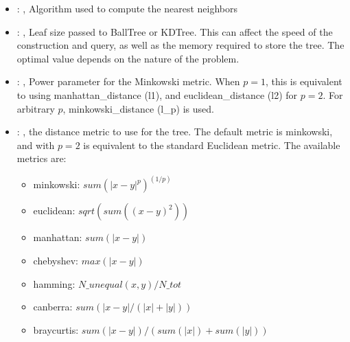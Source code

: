 \begin{itemize}
    \item {}: ,
      Algorithm used to compute the nearest neighbors

    \item {}: ,
      Leaf size passed to BallTree or KDTree. This can affect the speed of the construction
      and query, as well as the memory required to store the tree. The optimal value depends on the
      nature of the problem.

    \item {}: ,
      Power parameter for the Minkowski metric. When $p = 1$, this is equivalent to using
      manhattan\_distance (l1), and euclidean\_distance (l2) for $p = 2$. For arbitrary $p$,
      minkowski\_distance                                                  (l\_p) is used.

    \item {}: ,
      the distance metric to use for the tree. The default metric is minkowski, and with
      $p=2$ is equivalent to the standard Euclidean metric.
      The available metrics are:                                                  \begin{itemize}
      \item minkowski: $sum(|x - y|^p)^(1/p)$
      \item euclidean: $sqrt(sum((x - y)^2))$
      \item manhattan: $sum(|x - y|)$                                                    \item
      chebyshev: $max(|x - y|)$                                                    \item hamming:
      $N\_unequal(x, y) / N\_tot$                                                    \item canberra:
      $sum(|x - y| / (|x| + |y|))$                                                    \item
      braycurtis: $sum(|x - y|) / (sum(|x|) + sum(|y|))$
      \end{itemize}
  \end{itemize}


